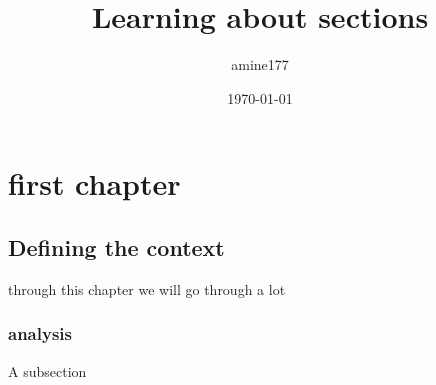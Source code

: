 \documentclass{report}
\begin{document}
\title{Learning about sections}
\author{amine177}
\date{\today}
\maketitle
\tableofcontents
\chapter{first chapter}
\section{Defining the context}
through this chapter we will go through a lot
\subsection{analysis}
A subsection
\end{document}
